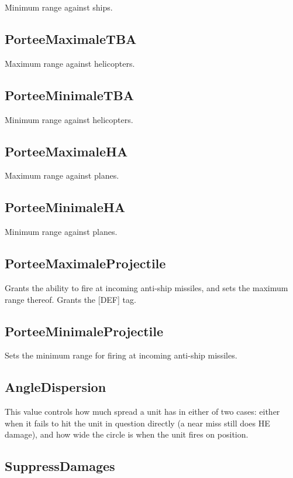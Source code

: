 \documentclass{article}
\begin{document}
Minimum range against ships.

\subsection{PorteeMaximaleTBA}

Maximum range against helicopters.

\subsection{PorteeMinimaleTBA}

Minimum range against helicopters.

\subsection{PorteeMaximaleHA}

Maximum range against planes.

\subsection{PorteeMinimaleHA}

Minimum range against planes.

\subsection{PorteeMaximaleProjectile}

Grants the ability to fire at incoming anti-ship missiles, and sets the maximum range thereof. Grants the [DEF] tag.

\subsection{PorteeMinimaleProjectile}

Sets the minimum range for firing at incoming anti-ship missiles.

\subsection{AngleDispersion}

This value controls how much spread a unit has in either of two cases: either when it fails to hit the unit in question directly (a near miss still does HE damage), and how wide the circle is when the unit fires on position.

\subsection{SuppressDamages}
\end{document}
